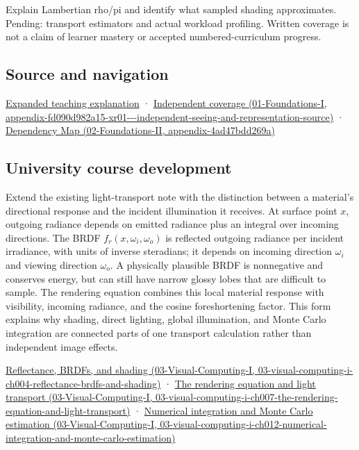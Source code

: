 Explain Lambertian rho/pi and identify what sampled shading approximates. Pending: transport estimators and actual workload profiling. Written coverage is not a claim of learner mastery or accepted numbered-curriculum progress.

\subsection{Source and navigation}\label{appendix-96da0b153b77-source-and-navigation}

\hyperref[04-visual-computing-ii-ch042-materials-turn-incoming-light-into-outgoing-light]{Expanded teaching explanation} · \href{../01-Foundations-I/main.pdf\#nameddest=appendix-fd090d982a15-xr01---independent-seeing-and-representation-source}{Independent coverage (01-Foundations-I, appendix-fd090d982a15-xr01-\/-\/-independent-seeing-and-representation-source)} · \href{../02-Foundations-II/main.pdf\#nameddest=appendix-4ad47bdd269a}{Dependency Map (02-Foundations-II, appendix-4ad47bdd269a)}

\subsection{University course development}\label{appendix-96da0b153b77-university-course-development}

Extend the existing light-transport note with the distinction between a material's directional response and the incident illumination it receives. At surface point \(x\), outgoing radiance depends on emitted radiance plus an integral over incoming directions. The BRDF \(f_r(x,\omega_i,\omega_o)\) is reflected outgoing radiance per incident irradiance, with units of inverse steradians; it depends on incoming direction \(\omega_i\) and viewing direction \(\omega_o\). A physically plausible BRDF is nonnegative and conserves energy, but can still have narrow glossy lobes that are difficult to sample. The rendering equation combines this local material response with visibility, incoming radiance, and the cosine foreshortening factor. This form explains why shading, direct lighting, global illumination, and Monte Carlo integration are connected parts of one transport calculation rather than independent image effects.

\href{../03-Visual-Computing-I/main.pdf\#nameddest=03-visual-computing-i-ch004-reflectance-brdfs-and-shading}{Reflectance, BRDFs, and shading (03-Visual-Computing-I, 03-visual-computing-i-ch004-reflectance-brdfs-and-shading)} · \href{../03-Visual-Computing-I/main.pdf\#nameddest=03-visual-computing-i-ch007-the-rendering-equation-and-light-transport}{The rendering equation and light transport (03-Visual-Computing-I, 03-visual-computing-i-ch007-the-rendering-equation-and-light-transport)} · \href{../03-Visual-Computing-I/main.pdf\#nameddest=03-visual-computing-i-ch012-numerical-integration-and-monte-carlo-estimation}{Numerical integration and Monte Carlo estimation (03-Visual-Computing-I, 03-visual-computing-i-ch012-numerical-integration-and-monte-carlo-estimation)}
